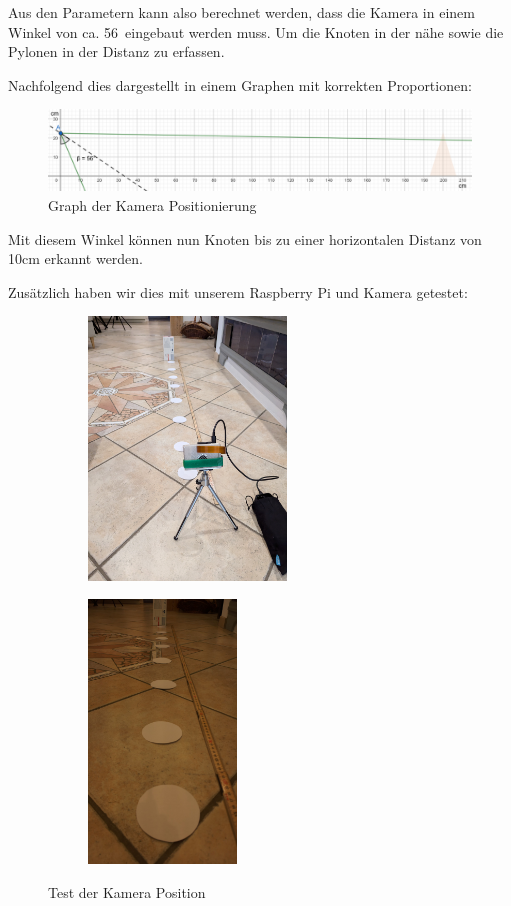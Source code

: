 Aus den Parametern kann also berechnet werden, dass die Kamera in einem Winkel von ca. 56\textdegree\ eingebaut werden muss. Um die Knoten in der nähe sowie die Pylonen in der Distanz zu erfassen.

Nachfolgend dies dargestellt in einem Graphen mit korrekten Proportionen:

\begin{figure}[H]
    \centering
    \includegraphics[width=1\linewidth]{assets/informatik-prototyp/camera/camera_position_exact_bigger.png}
    \caption{Graph der Kamera Positionierung}
    \label{fig:camera-position-exact}
\end{figure}

Mit diesem Winkel können nun Knoten bis zu einer horizontalen Distanz von 10cm erkannt werden.

Zusätzlich haben wir dies mit unserem Raspberry Pi und Kamera getestet:

\begin{figure}[H]
\centering
\begin{subfigure}{0.45\textwidth}
\centering
    \includegraphics[height=7cm]{assets/informatik-prototyp/camera/camera_position_prototype_at_home.jpg}
\end{subfigure}
\begin{subfigure}{0.45\textwidth}
\centering
    \includegraphics[height=7cm]{assets/informatik-prototyp/camera/camera_position_prototype.jpg}
\end{subfigure}
\caption{Test der Kamera Position}
\label{fig:camera-position-prototype}
\end{figure}


